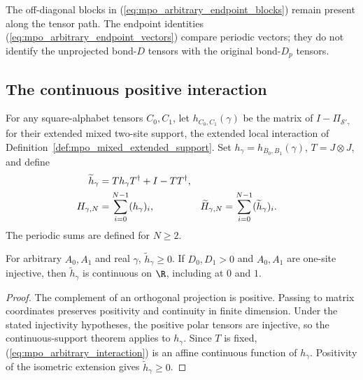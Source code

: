 The off-diagonal blocks in (\ref{eq:mpo_arbitrary_endpoint_blocks})
remain present along the tensor path. The endpoint identities
(\ref{eq:mpo_arbitrary_endpoint_vectors}) compare periodic vectors;
they do not identify the unprojected bond-$D$ tensors with the
original bond-$D_p$ tensors.

\subsection{The continuous positive interaction}

\begin{definition}
    \label{def:mpo_arbitrary_physical_interaction}
    \leanok
    For any square-alphabet tensors $C_0,C_1$, let
    $h_{C_0,C_1}(\gamma)$ be the matrix of
    $I-\Pi_{\mathcal S'_\gamma}$ for their extended mixed two-site
    support, the extended local interaction of
    Definition~\ref{def:mpo_mixed_extended_support}. Set
    $h_\gamma=h_{B_0,B_1}(\gamma)$, $T=J\otimes J$, and define
    \begin{align}
        \widetilde h_\gamma
                     & =Th_\gamma T^\dagger+I-TT^\dagger,\notag                                             \\
        H_{\gamma,N} & =\sum_{i=0}^{N-1}(h_\gamma)_i,
                     & \widetilde H_{\gamma,N}                  & =\sum_{i=0}^{N-1}(\widetilde h_\gamma)_i.
        \label{eq:mpo_arbitrary_interaction}
    \end{align}
    The periodic sums are defined for $N\geq2$.
\end{definition}

\begin{lemma}
    \label{thm:mpo_arbitrary_interaction_continuity}
    \leanok
    For arbitrary $A_0,A_1$ and real $\gamma$,
    $\widetilde h_\gamma\geq0$.
    If $D_0,D_1>0$ and $A_0,A_1$ are one-site injective, then
    $\widetilde h_\gamma$ is continuous on $\R$, including at $0$ and $1$.
\end{lemma}
\begin{proof}\leanok
    The complement of an orthogonal projection is positive.
    Passing to matrix coordinates preserves positivity and continuity
    in finite dimension. Under the stated injectivity hypotheses,
    the positive polar tensors are injective, so the continuous-support
    theorem applies to $h_\gamma$.
    Since $T$ is fixed, (\ref{eq:mpo_arbitrary_interaction}) is an
    affine continuous function of $h_\gamma$. Positivity of the
    isometric extension gives $\widetilde h_\gamma\geq0$.
\end{proof}

